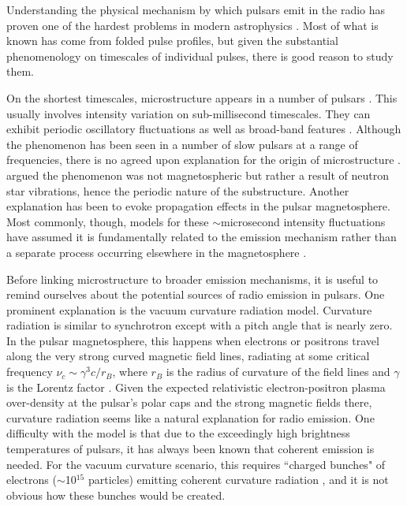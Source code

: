 Understanding the physical mechanism by which pulsars emit in the 
radio has proven one of the hardest problems 
in modern astrophysics \citep{1975ARA&A..13..511G, 2000ASPC..202..721M}. 
Most of what is known has come 
from folded pulse profiles, but given the substantial 
phenomenology on timescales of individual pulses, there 
is good reason to study them.

On the shortest timescales, microstructure appears in a number of pulsars 
\citep{1975PhDT.........9C, 1982ApJ...254L..35B, 
1998A&A...332..111L, 2002A&A...396..171P}. 
This usually involves 
intensity variation on sub-millisecond timescales. 
They can exhibit periodic oscillatory fluctuations 
as well as broad-band features \citep{1981A&A....93...85B}. 
Although the phenomenon has been seen in a number of slow pulsars 
at a range of frequencies, there is 
no agreed upon explanation for the origin of microstructure 
\citep{1998A&A...332..111L}. 
\citet{vanhorn} argued the phenomenon was not magnetospheric
but rather a result of neutron star vibrations, 
hence the periodic nature of the substructure. 
Another explanation has been to evoke propagation 
effects in the pulsar magnetosphere. Most commonly, though, 
models for these $\sim$microsecond intensity 
fluctuations have assumed it is fundamentally 
related to the emission mechanism 
rather than a separate process occurring elsewhere 
in the magnetosphere \citep{1998A&A...332..111L}.

Before linking microstructure to broader emission mechanisms, 
it is useful to remind ourselves about the potential 
sources of radio emission in pulsars. 
One prominent explanation is the vacuum curvature 
radiation model. Curvature radiation is similar to 
synchrotron except with a pitch angle that is nearly zero.
In the pulsar magnetosphere, this happens when electrons or positrons 
travel along the very strong curved
magnetic field lines, radiating 
at some critical frequency $\nu_c \sim \gamma^3 c/r_B$, 
where $r_B$ is the radius of curvature of the field lines and 
$\gamma$ is the Lorentz factor
\citep{1998pulsarastronomy}. Given the 
expected relativistic electron-positron plasma over-density at the
pulsar's polar caps and the strong magnetic fields there, 
curvature radiation seems like a natural explanation 
for radio emission. One difficulty with the model is that 
due to the exceedingly high brightness temperatures of 
pulsars, it has always been known that 
coherent emission is needed. For the vacuum curvature 
scenario, this requires ``charged bunches" of electrons 
($\sim$10$^{15}$ particles) emitting coherent curvature radiation 
\citep{2004ApJ...600..872G}, and it is not obvious 
how these bunches would be created.

